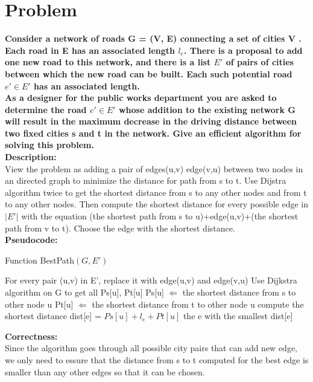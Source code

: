 \documentclass{article}
\begin{document}
\section{Problem \uppercase\expandafter{}}
\textbf{Consider a network of roads G = (V, E) connecting a set of cities V . Each road
in E has an associated length $l_e$. There is a proposal to add one new road to this network,
and there is a list $E'$ of pairs of cities between which the new road can be built. Each such
potential road $e' \in E'$ has an associated length.\\
As a designer for the public works department you are asked to determine the road $e' \in E'$ whose addition to the existing network G will result in the maximum decrease in the driving
distance between two fixed cities s and t in the network. Give an efficient algorithm for
solving this problem.\\}
\textbf{\large Description:\\}
View the problem as adding a pair of edges(u,v) edge(v,u) between two nodes in an directed graph to minimize the distance for path from s to t. Use Dijstra algorithm twice to get the shortest distance from s to any other nodes and from t to any other nodes. Then compute the shortest distance for every possible edge in $|E'|$ with the equation (the shortest path from s to u)+edge(u,v)+(the shortest path from v to t). Choose the edge with the shortest distance.\\
\textbf{\large Pseudocode:\\}
\begin{algorithm}[H]
  \caption{Function BestPath$(G,E')$}
  \label{alg1}
  \begin{algorithmic}
  \STATE For every pair (u,v) in E', replace it with edge(u,v) and edge(v,u)
  \STATE Use Dijkstra algorithm on G to get all Ps[u], Pt[u]
  \STATE Ps[u] $\Longleftarrow$ the shortest distance from s to other node u
  \STATE Pt[u] $\Longleftarrow$ the shortest distance from t to other node u
  \STATE compute the shortest distance dist[e] = $Ps[u] +l_e+ Pt[u]$
  \ENDFOR
  \RETURN the e with the smallest dist[e]
  \end{algorithmic}
\end{algorithm}
\noindent\textbf{\large Correctness:\\}
Since the algorithm goes through all possible city pairs that can add new edge, we only need to essure that the distance from s to t computed for the best edge is smaller than any other edges so that it can be chosen.\\ 
\end{document}
